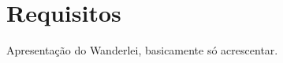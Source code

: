 \chapter{Requisitos}
\label{cap:requisitos}

Apresentação do Wanderlei, basicamente só acrescentar. 